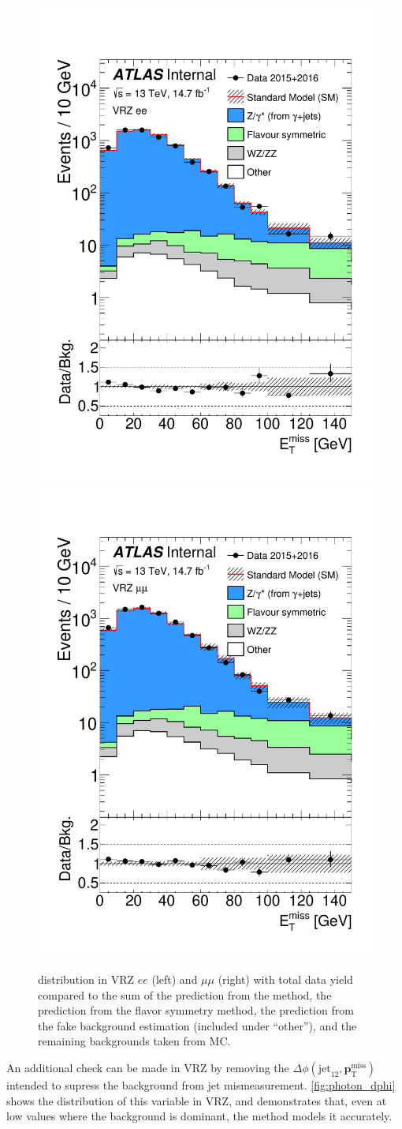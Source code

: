 \begin{centering}
\begin{figure}[!hbt]
\myfloatalign
\includegraphics[width=.45\linewidth]{figures/photons/MET_azmet_ee_onz.pdf}
\includegraphics[width=.45\linewidth]{figures/photons/MET_azmet_mm_onz.pdf}
\caption{\MET distribution in VRZ $ee$ (left) and $\mu\mu$ (right) with total data yield compared to the sum of the prediction from the \gjets method, the prediction from the flavor symmetry method, the prediction from the fake background estimation (included under ``other''), and the remaining backgrounds taken from \ac{MC}.}
\label{fig:photon_validation}
\end{figure}
\end{centering}

An additional check can be made in VRZ by removing the $\Delta\phi(\text{jet}_{12},{\boldsymbol p}_{\mathrm{T}}^\mathrm{miss})$ intended to supress the \dyjets background from jet mismeasurement. \autoref{fig:photon_dphi} shows the distribution of this variable in VRZ, and demonstrates that, even at low values where the \dyjets background is dominant, the \gjets method models it accurately.



